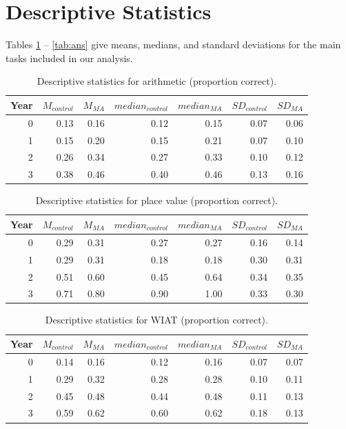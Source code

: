 \documentclass[11pt]{article}
\begin{document}
\section{Descriptive Statistics}

Tables \ref{tab:arith} -- \ref{tab:ans} give means, medians, and standard deviations for the main tasks included in our analysis.

\begin{table}[H]
\centering
\begin{tabular}{rrrrrrr}
  \hline
Year & $M_{control}$ & $M_{MA}$ & $median_{control}$ & $median_{MA}$ & $SD_{control}$ & $SD_{MA}$ \\
  \hline
  0 & 0.13 & 0.16 & 0.12 & 0.15 & 0.07 & 0.06 \\
    1 & 0.15 & 0.20 & 0.15 & 0.21 & 0.07 & 0.10 \\
    2 & 0.26 & 0.34 & 0.27 & 0.33 & 0.10 & 0.12 \\
    3 & 0.38 & 0.46 & 0.40 & 0.46 & 0.13 & 0.16 \\
   \hline
\end{tabular}
\caption{Descriptive statistics for arithmetic (proportion correct).}
\label{tab:arith}
\end{table}
\begin{table}[H]
\centering
\begin{tabular}{rrrrrrr}
  \hline
Year & $M_{control}$ & $M_{MA}$ & $median_{control}$ & $median_{MA}$ & $SD_{control}$ & $SD_{MA}$ \\
  \hline
  0 & 0.29 & 0.31 & 0.27 & 0.27 & 0.16 & 0.14 \\
    1 & 0.29 & 0.31 & 0.18 & 0.18 & 0.30 & 0.31 \\
    2 & 0.51 & 0.60 & 0.45 & 0.64 & 0.34 & 0.35 \\
    3 & 0.71 & 0.80 & 0.90 & 1.00 & 0.33 & 0.30 \\
   \hline
\end{tabular}
\caption{Descriptive statistics for place value (proportion correct).}
\label{tab:placeval}
\end{table}

\begin{table}[ht]
\centering
\begin{tabular}{rrrrrrr}
  \hline
Year & $M_{control}$ & $M_{MA}$ & $median_{control}$ & $median_{MA}$ & $SD_{control}$ & $SD_{MA}$ \\
  \hline
  0 & 0.14 & 0.16 & 0.12 & 0.16 & 0.07 & 0.07 \\
    1 & 0.29 & 0.32 & 0.28 & 0.28 & 0.10 & 0.11 \\
    2 & 0.45 & 0.48 & 0.44 & 0.48 & 0.11 & 0.13 \\
    3 & 0.59 & 0.62 & 0.60 & 0.62 & 0.18 & 0.13 \\
   \hline
\end{tabular}
\caption{Descriptive statistics for WIAT (proportion correct).}
\label{tab:wiat}
\end{table}
\end{document}
